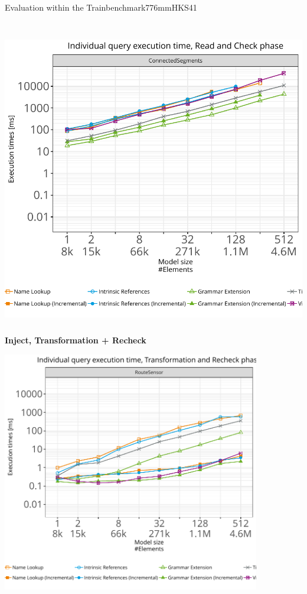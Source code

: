 \documentclass[rgb,cdgeometry=no,cd=true,cdhead=bicolor,cdfont=false,cdfoot=color,cdfont=nodin,english,paper=A0,fontsize=32pt,DIV=25,usegeometry]{tudscrposter}
\begin{document}
\begin{contentbox}[280mm]{Evaluation within the Trainbenchmark}{776mm}{HKS41}
\begin{minipage}{540mm}
\begin{minipage}{190mm}
\\[4mm]
\noindent{}
\includegraphics[height=13cm,keepaspectratio,clip,trim=0cm 2.2cm 0cm 1.35cm]{images/repair-Read-and-Check-ConnectedSegments.pdf}
\end{minipage}
\begin{minipage}{150mm}
\hspace{2mm} \textbf{Inject, Transformation + Recheck}\par\vspace{2mm}
\includegraphics[height=10.5cm,keepaspectratio,clip,trim=2.3cm 4.2cm 0cm 1.35cm]{images/inject-Transformation-and-Recheck-RouteSensor.pdf}

\end{minipage}
\end{minipage}
\end{contentbox}
\end{document}
